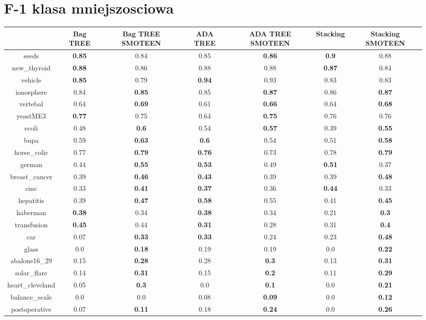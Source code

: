 \documentclass{article}%
\begin{document}
%
\section*{F{-}1 klasa mniejszosciowa}%
\begin{tabular}{c|cccccc}%
&Bag TREE&Bag TREE SMOTEEN&ADA TREE&ADA TREE SMOTEEN&Stacking&Stacking SMOTEEN\\%
\hline%
seeds&\textbf{0.85}&0.84&0.85&\textbf{0.86}&\textbf{0.9}&0.88\\%
new\_thyroid&\textbf{0.88}&0.86&0.88&0.88&\textbf{0.87}&0.84\\%
vehicle&\textbf{0.85}&0.79&\textbf{0.94}&0.93&0.83&0.83\\%
ionosphere&0.84&\textbf{0.85}&0.85&\textbf{0.87}&0.86&\textbf{0.87}\\%
vertebal&0.64&\textbf{0.69}&0.61&\textbf{0.66}&0.64&\textbf{0.68}\\%
yeastME3&\textbf{0.77}&0.75&0.64&\textbf{0.75}&0.76&0.76\\%
ecoli&0.48&\textbf{0.6}&0.54&\textbf{0.57}&0.39&\textbf{0.55}\\%
bupa&0.59&\textbf{0.63}&\textbf{0.6}&0.54&0.51&\textbf{0.58}\\%
horse\_colic&0.77&\textbf{0.79}&\textbf{0.76}&0.73&0.78&\textbf{0.79}\\%
german&0.44&\textbf{0.55}&\textbf{0.53}&0.49&\textbf{0.51}&0.37\\%
breast\_cancer&0.39&\textbf{0.46}&\textbf{0.43}&0.39&0.39&\textbf{0.48}\\%
cmc&0.33&\textbf{0.41}&\textbf{0.37}&0.36&\textbf{0.44}&0.33\\%
hepatitis&0.39&\textbf{0.47}&\textbf{0.58}&0.55&0.41&\textbf{0.45}\\%
haberman&\textbf{0.38}&0.34&\textbf{0.38}&0.34&0.21&\textbf{0.3}\\%
transfusion&\textbf{0.45}&0.44&\textbf{0.31}&0.28&0.31&\textbf{0.4}\\%
car&0.07&\textbf{0.33}&\textbf{0.33}&0.24&0.23&\textbf{0.48}\\%
glass&0.0&\textbf{0.18}&0.19&0.19&0.0&\textbf{0.22}\\%
abalone16\_29&0.15&\textbf{0.28}&0.28&\textbf{0.3}&0.13&\textbf{0.31}\\%
solar\_flare&0.14&\textbf{0.31}&0.15&\textbf{0.2}&0.11&\textbf{0.29}\\%
heart\_cleveland&0.05&\textbf{0.3}&0.0&\textbf{0.1}&0.0&\textbf{0.21}\\%
balance\_scale&0.0&0.0&0.08&\textbf{0.09}&0.0&\textbf{0.12}\\%
postoperative&0.07&\textbf{0.11}&0.18&\textbf{0.24}&0.0&\textbf{0.26}\\%
\end{tabular}
\end{document}
